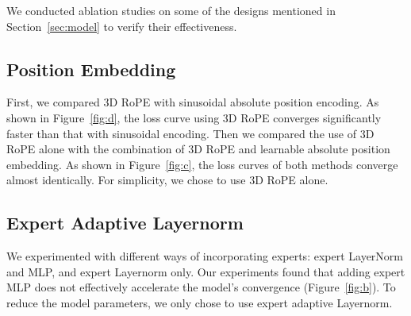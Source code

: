 

We conducted ablation studies on some of the designs mentioned in Section~\ref{sec:model} to verify their effectiveness.


\subsection{Position Embedding}
First, we compared 3D RoPE with sinusoidal absolute position encoding. As shown in Figure~\ref{fig:d}, the loss curve using 3D RoPE converges significantly faster than that with sinusoidal encoding.
Then we compared the use of 3D RoPE alone with the combination of 3D RoPE and learnable absolute position embedding. As shown in Figure~\ref{fig:c}, the loss curves of both methods converge almost identically. For simplicity, we chose to use 3D RoPE alone.

\subsection{Expert Adaptive Layernorm}
We experimented with different ways of incorporating experts: expert LayerNorm and MLP, and expert Layernorm only. Our experiments found that adding expert MLP does not effectively accelerate the model's convergence (Figure~\ref{fig:b}). To reduce the model parameters, we only chose to use expert adaptive Layernorm.